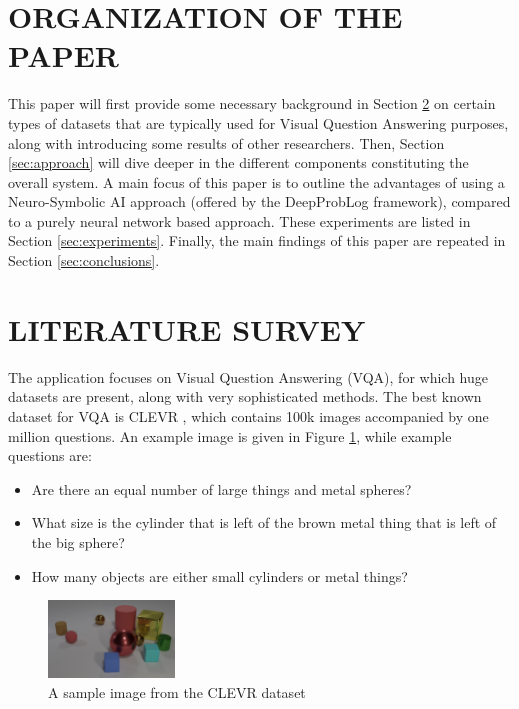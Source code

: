 \documentclass[english]{sobraep}
\begin{document}
\section{ORGANIZATION OF THE PAPER}
This paper will first provide some necessary background in Section \ref{sec:literature_survey} on certain types of datasets that are typically used for Visual Question Answering purposes, along with introducing some results of other researchers. Then, Section \ref{sec:approach} will dive deeper in the different components constituting the overall system. A main focus of this paper is to outline the advantages of using a Neuro-Symbolic AI approach (offered by the DeepProbLog framework), compared to a purely neural network based approach. These experiments are listed in Section \ref{sec:experiments}. Finally, the main findings of this paper are repeated in Section \ref{sec:conclusions}.

\section{LITERATURE SURVEY}
\label{sec:literature_survey}
The application focuses on Visual Question Answering (VQA), for which huge datasets are present, along with very sophisticated methods. The best known dataset for VQA is CLEVR \cite{clevr_dataset}, which contains 100k images accompanied by one million questions. An example image is given in Figure \ref{fig:sample_image_clevr}, while example questions are:
\begin{itemize}
    \item Are there an equal number of large things and metal spheres?
    \item What size is the cylinder that is left of the brown metal thing that is left of the big sphere?
    \item How many objects are either small cylinders or metal things?
\end{itemize}

\begin{figure}[htp]
    \begin{center}
    \includegraphics[width=0.3\textwidth]{clevr.jpg}
    \captionsetup{justification=centering}
    \caption{A sample image from the CLEVR dataset \cite{clevr_dataset}}
    \label{fig:sample_image_clevr}
    \end{center}
\end{figure}
\end{document}
